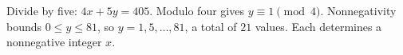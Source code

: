 Divide by five: $4x+5y=405$. Modulo four gives $y\equiv1\pmod4$. Nonnegativity bounds $0\le y\le81$, so $y=1,5,\ldots,81$, a total of $\boxed{21}$ values. Each determines a nonnegative integer $x$.

